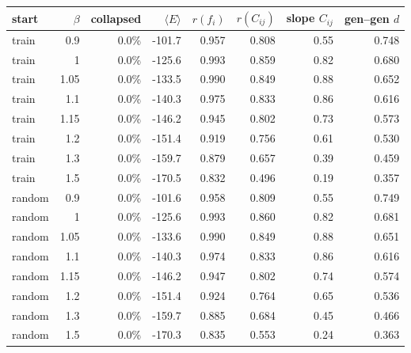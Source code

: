 \begin{tabular}{lrrrrrrr}
\toprule
start & $\beta$ & collapsed & $\langle E\rangle$ & $r(f_i)$ & $r(C_{ij})$ & slope $C_{ij}$ & gen--gen $d$ \\
\midrule
train & 0.9 & 0.0\% & -101.7 & 0.957 & 0.808 & 0.55 & 0.748 \\
train & 1 & 0.0\% & -125.6 & 0.993 & 0.859 & 0.82 & 0.680 \\
train & 1.05 & 0.0\% & -133.5 & 0.990 & 0.849 & 0.88 & 0.652 \\
train & 1.1 & 0.0\% & -140.3 & 0.975 & 0.833 & 0.86 & 0.616 \\
train & 1.15 & 0.0\% & -146.2 & 0.945 & 0.802 & 0.73 & 0.573 \\
train & 1.2 & 0.0\% & -151.4 & 0.919 & 0.756 & 0.61 & 0.530 \\
train & 1.3 & 0.0\% & -159.7 & 0.879 & 0.657 & 0.39 & 0.459 \\
train & 1.5 & 0.0\% & -170.5 & 0.832 & 0.496 & 0.19 & 0.357 \\
\midrule
random & 0.9 & 0.0\% & -101.6 & 0.958 & 0.809 & 0.55 & 0.749 \\
random & 1 & 0.0\% & -125.6 & 0.993 & 0.860 & 0.82 & 0.681 \\
random & 1.05 & 0.0\% & -133.6 & 0.990 & 0.849 & 0.88 & 0.651 \\
random & 1.1 & 0.0\% & -140.3 & 0.974 & 0.833 & 0.86 & 0.616 \\
random & 1.15 & 0.0\% & -146.2 & 0.947 & 0.802 & 0.74 & 0.574 \\
random & 1.2 & 0.0\% & -151.4 & 0.924 & 0.764 & 0.65 & 0.536 \\
random & 1.3 & 0.0\% & -159.7 & 0.885 & 0.684 & 0.45 & 0.466 \\
random & 1.5 & 0.0\% & -170.3 & 0.835 & 0.553 & 0.24 & 0.363 \\
\bottomrule
\end{tabular}